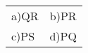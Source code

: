  \setlength{\tabcolsep}{80pt}
 \renewcommand{\arraystretch}{2}
 
  \begin{tabular}{l c}
	  a)QR & b)PR \\
	  c)PS & d)PQ
  \end{tabular}
